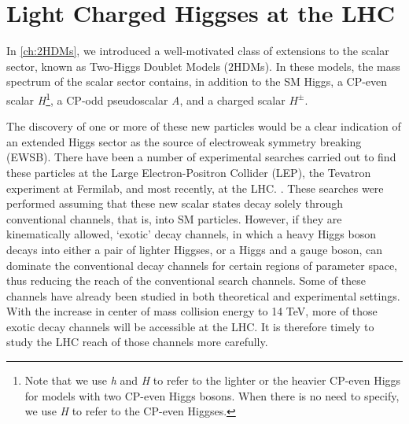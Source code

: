 \chapter{Light Charged Higgses at the LHC}\label{ch:LightChargedHiggs}

\def\h{h}
\def\H{h}
\def\A{A}
\newcommand{\sba}{\ensuremath{\sin(\beta-\alpha)}}
\newcommand{\cba}{\ensuremath{\cos(\beta-\alpha)}}
\newcommand{\met}{\ensuremath{{\not\mathrel{E}}_T}}
\newcommand{\ifb}{\ensuremath{ \text{fb}^{-1} }}
\newcommand{\cmark}{\ding{51}}%
\newcommand{\xmark}{\ding{55}}%

In \autoref{ch:2HDMs}, we introduced a well-motivated class of extensions to the scalar sector, known as Two-Higgs Doublet Models ($2$HDMs). In these models, the mass spectrum of the scalar sector contains, in addition to the SM Higgs, a CP-even scalar \emph{H}\footnote{Note that we use \emph{h} and \emph{H} to refer to the lighter or the heavier CP-even Higgs for models with two CP-even Higgs bosons. When there is no need to specify, we use \emph{H} to refer to the CP-even Higgses.}, a CP-odd pseudoscalar \emph{A}, and a charged scalar $H^\pm$. 

The discovery of one or more of these new particles would be a clear indication of an extended Higgs sector as the source of electroweak symmetry breaking (EWSB). There have been a number of experimental searches carried out to find these particles at the Large Electron-Positron Collider (LEP), the Tevatron experiment at Fermilab, and most recently, at the LHC. \cite{LEP_Higgs, Aad:2014vgg, Khachatryan:2014wca, TheATLAScollaboration:2013wia, CMS:2014cdp, Aad:2013hla, CMS:2014kga, Khachatryan:2015cwa}. These searches were performed assuming that these new scalar states decay solely through conventional channels, that is, into SM particles. However, if they are kinematically allowed, `exotic' decay channels, in which a heavy Higgs boson decays into either a pair of lighter Higgses, or a Higgs and a gauge boson, can dominate the conventional decay channels for certain regions of parameter space, thus reducing the reach of the conventional search channels. Some of these channels have already been studied in both theoretical \cite{Curtin:2013fra, Brownson:2013lka, Coleppa:2014hxa, Coleppa:2014cca,Li:2015lra,Dorsch:2014qja,Chen:2013emb,Chen:2014dma,Enberg:2014pua} and experimental \cite{Aad:2015wra, CMS:2014yra,CMS:2013eua} settings. With the increase in center of mass collision energy to 14 TeV, more of those exotic decay channels will be accessible at the LHC. It is therefore timely to study the LHC reach of those channels more carefully.

